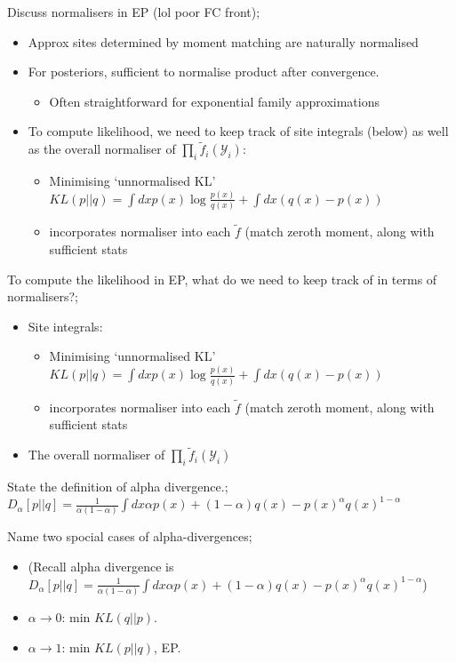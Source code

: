 \documentclass{article}
\begin{document}
Discuss normalisers in EP (lol poor FC front); \begin{itemize}
    \item Approx sites determined by moment matching are naturally normalised
    \item For posteriors, sufficient to normalise product after convergence. \begin{itemize}
        \item Often straightforward for exponential family approximations
    \end{itemize}
    \item To compute likelihood, we need to keep track of site integrals (below) as well as the overall normaliser of $\prod_i\tilde{f}_i(\mathcal{Y}_i)$: \begin{itemize}
        \item Minimising `unnormalised KL' $KL(p||q) = \int dx p(x)\log \frac{p(x)}{q(x)} + \int dx (q(x) - p(x))$ \item incorporates normaliser into each $\tilde{f}$ (match zeroth moment, along with sufficient stats
    \end{itemize}
\end{itemize}

To compute the likelihood in EP, what do we need to keep track of in terms of normalisers?; \begin{itemize}
    \item Site integrals: \begin{itemize}
        \item Minimising `unnormalised KL' $KL(p||q) = \int dx p(x)\log \frac{p(x)}{q(x)} + \int dx (q(x) - p(x))$ \item incorporates normaliser into each $\tilde{f}$ (match zeroth moment, along with sufficient stats
    \end{itemize}
    \item The overall normaliser of $\prod_i\tilde{f}_i(\mathcal{Y}_i)$
\end{itemize}

State the definition of alpha divergence.; $D_{\alpha}[p||q] = \frac{1}{\alpha(1-\alpha)}\int dx \alpha p(x) + (1-\alpha)q(x) - p(x)^{\alpha}q(x)^{1-\alpha}$


Name two spocial cases of alpha-divergences; \begin{itemize}
    \item (Recall alpha divergence is $D_{\alpha}[p||q] = \frac{1}{\alpha(1-\alpha)}\int dx \alpha p(x) + (1-\alpha)q(x) - p(x)^{\alpha}q(x)^{1-\alpha}$)
    \item $\alpha\rightarrow 0$: min $KL(q||p)$.
    \item $\alpha\rightarrow 1$: min $KL(p||q)$, EP.
\end{itemize}
\end{document}
